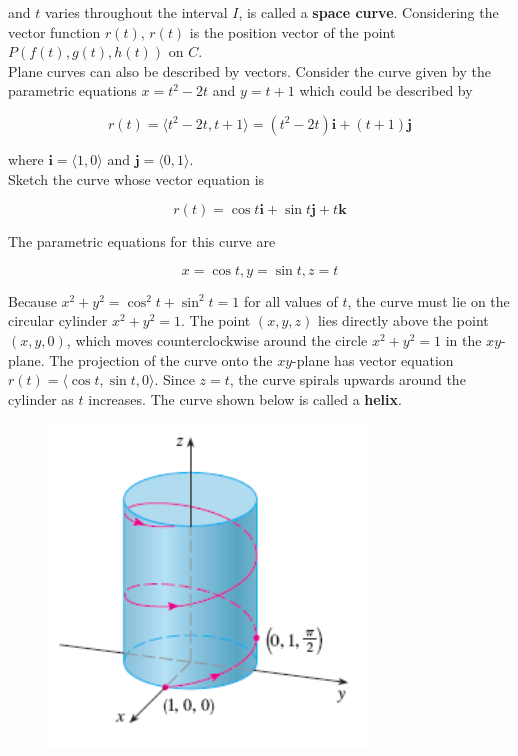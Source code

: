         and $t$ varies throughout the interval $I$, is called a \textbf{space curve}. Considering the vector function $r(t)$, $r(t)$ is the position vector of the point $P(f(t), g(t), h(t))$ on $C$. \\

        Plane curves can also be described by vectors. Consider the curve given by the parametric equations $x = t^2 -2t$ and $y = t+1$ which could be described by

        \[
            r(t) = \langle t^2 - 2t, t + 1\rangle = (t^2 - 2t)\mathbf{i} + (t+1) \mathbf{j}
        \]

        where $\mathbf{i} = \langle 1, 0\rangle$ and $\mathbf{j}= \langle 0, 1\rangle$. \\

        \textit{} Sketch the curve whose vector equation is

        \[
            r(t) = \cos{t}\mathbf{i} + \sin{t}\mathbf{j} + t\mathbf{k}
        \]

        The parametric equations for this curve are

        \[
            x = \cos{t}, y = \sin{t}, z =t
        \]

        Because $x^2 + y^2 = \cos^2{t} + \sin^2{t} = 1$ for all values of $t$, the curve must lie on the circular cylinder $x^2 + y^2 = 1$. The point $(x,y,z)$ lies directly above the point $(x,y,0)$, which moves
        counterclockwise around the circle $x^2 + y^2 = 1$ in the $xy$-plane. The projection of the curve onto the $xy$-plane has vector equation $r(t) = \langle \cos{t}, \sin{t}, 0\rangle$. Since $z=t$, the curve
        spirals upwards around the cylinder as $t$ increases. The curve shown below is called a \textbf{helix}.

        \begin{figure}[hbt!]
            \centering
            \includegraphics[]{Resources/13.1_Helix}
        \end{figure}

